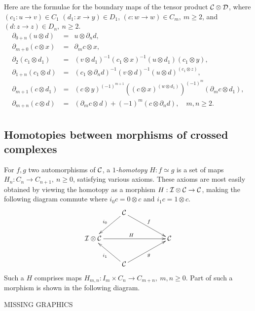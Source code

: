\newpage
Here are the formulae for the boundary maps of the tensor product 
$\mathcal{C}\otimes\mathcal{D}$, 
where $(c_1 : u \to v) \in C_1$ $(d_1 : x \to y) \in D_1$, 
$(c : w \to w) \in C_m,~ m \geqslant 2$, 
and $(d : z \to z) \in D_n,~ n \geqslant 2$.   
\begin{eqnarray*}
\partial_{0+n}(u \otimes d) 
  &=&  u \otimes \partial_n d, \\
\partial_{m+0}(c \otimes x) 
  &=&  \partial_m c \otimes x, \\
\partial_2(c_1 \otimes d_1) 
  &=&  (v \otimes d_1)^{-1} (c_1 \otimes x)^{-1} 
          (u \otimes d_1) (c_1 \otimes y), \\
\partial_{1+n}(c_1 \otimes d) 
  &=&  (c_1 \otimes \partial_n d)^{-1} (v \otimes d)^{-1} 
         (u \otimes d)^{(c_1 \otimes z)}, \\
\partial_{m+1}(c \otimes d_1) 
  &=&  (c \otimes y)^{(-1)^{m+1}} 
         \left((c \otimes x)^{(w \otimes d_1)}\right)^{(-1)^m} 
         (\partial_mc \otimes d_1),\\
\partial_{m+n}(c \otimes d) 
  &=&  (\partial_m c \otimes d) + (-1)^m(c \otimes \partial_n d), 
\quad m,n \geqslant 2. \\
\end{eqnarray*}


\newpage
\subsection{Homotopies between morphisms of crossed complexes}
\label{subsect:homotopy-xcomp}

For $f,g$ two automorphisms of $\mathcal{C}$, a \emph{$1$-homotopy} 
$H : f \simeq g$ is a set of maps 
$H_n : C_n \to C_{n+1},~ n \geqslant 0$, 
satisfying various axioms. 
These axioms are most easily obtained by viewing the homotopy 
as a morphism $H : \mathcal{I}\otimes\mathcal{C} \to \mathcal{C}$, 
making the following diagram commute where $i_0c = 0 \otimes c$ 
and $i_1c = 1 \otimes c$. 
$$
\xymatrix{ 
   & \calC \ar[ld]_{i_0} \ar[drr]^f
     & & \\
  \calI\otimes\calC \ar[rrr]^{H}  
   & & & \calC \\
   & \calC \ar[lu]^{i_1} \ar[rru]_g 
     & & \\
}
$$
Such a $H$ comprises maps 
$H_{m,n} : I_m \times C_n \to C_{m+n},~ m,n \geqslant 0$.  
Part of such a morphism is shown in the following diagram. 

\hspace*{6mm}
\begin{center}
MISSING GRAPHICS
\end{center}

